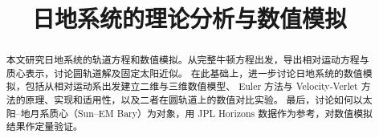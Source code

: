 \documentclass[12pt,a4paper]{ctexrep}
\title{日地系统的理论分析与数值模拟}
\author{}
\date{}
\begin{document}
\maketitle

\begin{abstract}
本文研究日地系统的轨道方程和数值模拟。从完整牛顿方程出发，导出相对运动方程与质心表示，讨论圆轨道解及固定太阳近似。
在此基础上，进一步讨论日地系统的数值模拟，包括从相对运动系出发建立二维与三维数值模型、
Euler 方法与 Velocity-Verlet 方法的原理、实现和适用性，以及二者在圆轨道上的数值对比实验。
最后，讨论如何以太阳--地月系质心（Sun--EM Bary）为对象，用 JPL Horizons 数据作为参考，对数值模拟结果作定量验证。
\end{abstract}

\tableofcontents








\end{document}
